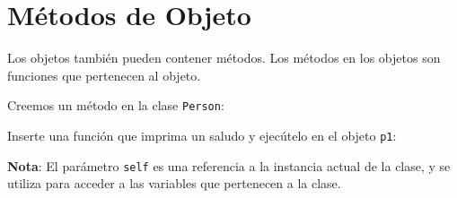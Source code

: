 \section{Métodos de Objeto}

Los objetos también pueden contener métodos. Los métodos en los objetos
son funciones que pertenecen al objeto.

Creemos un método en la clase \texttt{Person}:\\

\begin{code}
Inserte una función que imprima un saludo y ejecútelo en el objeto \texttt{p1}:

\begin{Shaded}
\begin{Highlighting}[]
   \NormalTok{(}
    \OperatorTok{=}
    \OperatorTok{=}

  \NormalTok{):}
    \NormalTok{(} \OperatorTok{+} 

\OperatorTok{=}\NormalTok{, }\NormalTok{)}

\end{Highlighting}
\end{Shaded}
\end{code}

\textbf{Nota}: El parámetro \texttt{self} es una referencia a la
instancia actual de la clase, y se utiliza para acceder a las variables
que pertenecen a la clase.\\

